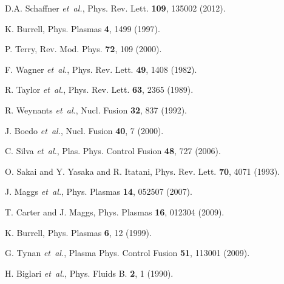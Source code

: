\documentclass[aip,pop,amsmath,amssymb,reprint,superscriptaddress]{revtex4-1} %
\begin{document}

\providecommand{\noopsort}[1]{}\providecommand{\singleletter}[1]{#1}%
\begin{thebibliography}{10}

D.A. Schaffner {\it et~al.}, Phys. Rev. Lett. {\bf 109}, 135002 (2012).

K. Burrell, Phys. Plasmas {\bf 4},  1499  (1997).

P. Terry, Rev. Mod. Phys. {\bf 72},  109  (2000).

F. Wagner {\it et~al.}, Phys. Rev. Lett. {\bf 49},  1408  (1982).

R. Taylor {\it et~al.}, Phys. Rev. Lett. {\bf 63},  2365  (1989).

R. Weynants {\it et~al.}, Nucl. Fusion {\bf 32},  837  (1992).

J. Boedo {\it et~al.}, Nucl. Fusion {\bf 40},  7  (2000).

C. Silva {\it et~al.}, Plas. Phys. Control Fusion {\bf 48},  727  (2006).

O. Sakai and Y. Yasaka and R. Itatani, Phys. Rev. Lett. {\bf 70},  4071 (1993).

J. Maggs {\it et~al.}, Phys. Plasmas {\bf 14},  052507  (2007).

T. Carter and J. Maggs, Phys. Plasmas {\bf 16},  012304  (2009).

K. Burrell, Phys. Plasmas {\bf 6},  12  (1999).

G. Tynan {\it et~al.}, Plasma Phys. Control Fusion {\bf 51}, 113001  (2009).

H. Biglari {\it et~al.}, Phys. Fluids B. {\bf 2},  1  (1990).


\end{thebibliography}
\end{document}

